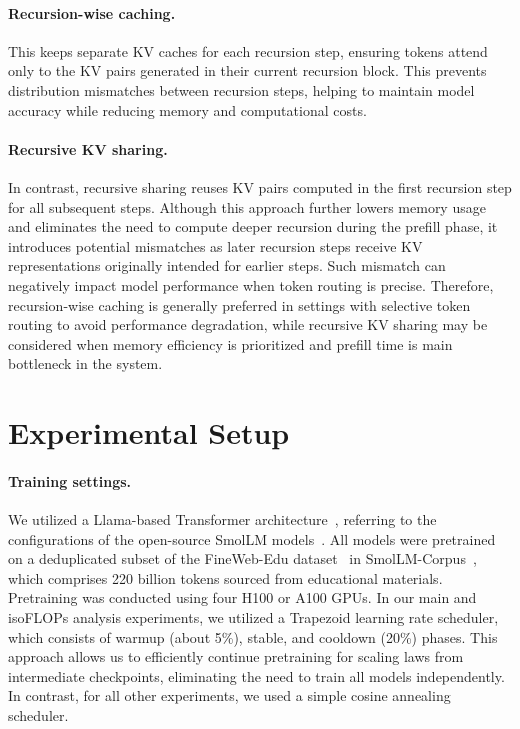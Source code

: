 \vspace{-10pt}
\paragraph{Recursion-wise caching.} This keeps separate KV caches for each recursion step, ensuring tokens attend only to the KV pairs generated in their current recursion block. This prevents distribution mismatches between recursion steps, helping to maintain model accuracy while reducing memory and computational costs.


\vspace{-10pt}
\paragraph{Recursive KV sharing.} In contrast, recursive sharing reuses KV pairs computed in the first recursion step for all subsequent steps. Although this approach further lowers memory usage and eliminates the need to compute deeper recursion during the prefill phase, it introduces potential mismatches as later recursion steps receive KV representations originally intended for earlier steps. Such mismatch can negatively impact model performance when token routing is precise.
Therefore, recursion-wise caching is generally preferred in settings with selective token routing to avoid performance degradation, while recursive KV sharing may be considered when memory efficiency is prioritized and prefill time is main bottleneck in the system.



\section{Experimental Setup}
\label{app:experimental_setup}


\paragraph{Training settings.}
We utilized a Llama-based Transformer architecture~\citep{grattafiori2024llama}, referring to the configurations of the open-source SmolLM models~\citep{allal2024SmolLM}. All models were pretrained on a deduplicated subset of the FineWeb-Edu dataset~\citep{penedo2024the} in SmolLM-Corpus~\citep{benallal2024smollmcorpus}, which comprises 220 billion tokens sourced from educational materials. Pretraining was conducted using four H100 or A100 GPUs. 
In our main and isoFLOPs analysis experiments, we utilized a Trapezoid learning rate scheduler, which consists of warmup (about 5\%), stable, and cooldown (20\%) phases. This approach allows us to efficiently continue pretraining for scaling laws from intermediate checkpoints, eliminating the need to train all models independently. In contrast, for all other experiments, we used a simple cosine annealing scheduler.


